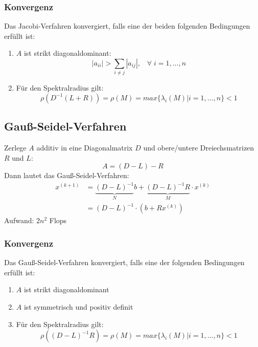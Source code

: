 \documentclass[a4paper,twocolumn,10pt]{article}
\begin{document}
\subsubsection{Konvergenz}
Das Jacobi-Verfahren konvergiert, falls eine der beiden folgenden Bedingungen erfüllt ist:
\begin{enumerate}[label=$\bullet$]
\item $A$ ist strikt diagonaldominant:
\begin{equation*}
|a_{ii}|>\sum\limits_{i\neq j}|a_{ij}|,\;\;\;\forall\;i=1,...,n
\end{equation*}
\item Für den Spektralradius gilt:
\begin{equation*}
\rho\left(D^{-1}(L+R)\right)=\rho(M)=max\{\lambda_i(M)|i=1,...,n\}<1
\end{equation*}
\end{enumerate}

\subsection{Gauß-Seidel-Verfahren}
Zerlege $A$ additiv in eine Diagonalmatrix $D$ und obere/untere Dreiechsmatrizen $R$ und $L$:
\begin{equation*}
A=(D-L)-R
\end{equation*}
Dann lautet das Gauß-Seidel-Verfahren:
\begin{equation*}
\begin{split}
x^{(k+1)}&=\underbrace{(D-L)^{-1}}_{N}b+\underbrace{(D-L)^{-1}R}_{M}\cdot x^{(k)}\\
&=(D-L)^{-1}\cdot\left(b+Rx^{(k)}\right)
\end{split}
\end{equation*}
Aufwand: $2n^2$ Flops

\subsubsection{Konvergenz}
Das Gauß-Seidel-Verfahren konvergiert, falls eine der folgenden Bedingungen erfüllt ist:
\begin{enumerate}[label=$\bullet$]
\item $A$ ist strikt diagonaldominant
\item $A$ ist symmetrisch und positiv definit
\item Für den Spektralradius gilt:
\begin{equation*}
\rho\left((D-L)^{-1}R\right)=\rho(M)=max\{\lambda_i(M)|i=1,...,n\}<1
\end{equation*}
\end{enumerate}
\end{document}
